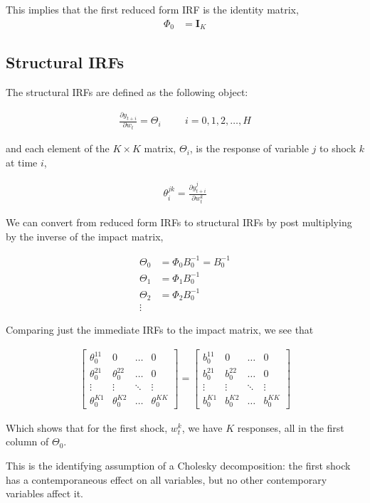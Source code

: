 \documentclass{article}
\newcommand*{\I}{\mathbf{I}}
\begin{document}
This implies that the first reduced form IRF is the identity matrix,
\begin{align*}
  \Phi_0 &= \I_K
\end{align*}

\subsection{Structural IRFs}

The structural IRFs are defined as the following object:

\begin{align*}
  \frac{\partial y_{t+i}}{\partial w_t} = \Theta_i \hspace{1cm} i = 0, 1, 2, \dots, H
\end{align*}

and each element of the $K \times K$ matrix, $\Theta_i$, is the response of variable $j$ to shock $k$ at time $i$,

\begin{align*}
  \theta^{jk}_{i} = \frac{\partial y_{t+i}^j}{\partial w_t^k}
\end{align*}

We can convert from reduced form IRFs to structural IRFs by post multiplying by the inverse of the impact matrix,

\begin{align*}
  \Theta_0 &= \Phi_0 B_0^{-1} = B_0^{-1}
  \\
  \Theta_1 &= \Phi_1 B_0^{-1}
  \\
  \Theta_2 &= \Phi_2 B_0^{-1}
  \\
  \vdots
\end{align*}

Comparing just the immediate IRFs to the impact matrix, we see that

\begin{align*}
  \begin{bmatrix}
    \theta_0^{11} & 0 & \dots & 0 \\
    \theta_0^{21} & \theta_0^{22} & \dots & 0 \\
    \vdots & \vdots & \ddots & \vdots \\
    \theta_0^{K1} & \theta_0^{K2} & \dots & \theta_0^{KK}
  \end{bmatrix}
  =
  \begin{bmatrix}
    b_0^{11} & 0 & \dots & 0 \\
    b_0^{21} & b_0^{22} & \dots & 0 \\
    \vdots & \vdots & \ddots & \vdots \\
    b_0^{K1} & b_0^{K2} & \dots & b_0^{KK}
  \end{bmatrix}
\end{align*}

Which shows that for the first shock, $w_t^k$, we have $K$ responses, all in the first column of $\Theta_0$.

This is the identifying assumption of a Cholesky decomposition: the first shock has a contemporaneous effect on all variables, but no other contemporary variables affect it.
\end{document}
